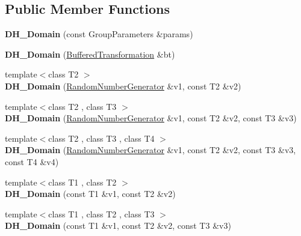 \subsection*{Public Member Functions}
\begin{DoxyCompactItemize}
\item 
\hypertarget{class_d_h___domain_a4bf1d2c72fc8aa1622604f30b9326781}{
{\bfseries DH\_\-Domain} (const GroupParameters \&params)}
\label{class_d_h___domain_a4bf1d2c72fc8aa1622604f30b9326781}

\item 
\hypertarget{class_d_h___domain_a22d4fd5eb712c853ebfdf976860e33c2}{
{\bfseries DH\_\-Domain} (\hyperlink{class_buffered_transformation}{BufferedTransformation} \&bt)}
\label{class_d_h___domain_a22d4fd5eb712c853ebfdf976860e33c2}

\item 
\hypertarget{class_d_h___domain_a0feb57c8aecf2942458d9d54c266047e}{
{\footnotesize template$<$class T2 $>$ }\\{\bfseries DH\_\-Domain} (\hyperlink{class_random_number_generator}{RandomNumberGenerator} \&v1, const T2 \&v2)}
\label{class_d_h___domain_a0feb57c8aecf2942458d9d54c266047e}

\item 
\hypertarget{class_d_h___domain_a0f6a43cbd906b4c2cb3a8d426b88148a}{
{\footnotesize template$<$class T2 , class T3 $>$ }\\{\bfseries DH\_\-Domain} (\hyperlink{class_random_number_generator}{RandomNumberGenerator} \&v1, const T2 \&v2, const T3 \&v3)}
\label{class_d_h___domain_a0f6a43cbd906b4c2cb3a8d426b88148a}

\item 
\hypertarget{class_d_h___domain_aa67c56ec1bbb356488d3b6e9d9f02e85}{
{\footnotesize template$<$class T2 , class T3 , class T4 $>$ }\\{\bfseries DH\_\-Domain} (\hyperlink{class_random_number_generator}{RandomNumberGenerator} \&v1, const T2 \&v2, const T3 \&v3, const T4 \&v4)}
\label{class_d_h___domain_aa67c56ec1bbb356488d3b6e9d9f02e85}

\item 
\hypertarget{class_d_h___domain_a636ba7b8547548621dc4f8c19a7216cb}{
{\footnotesize template$<$class T1 , class T2 $>$ }\\{\bfseries DH\_\-Domain} (const T1 \&v1, const T2 \&v2)}
\label{class_d_h___domain_a636ba7b8547548621dc4f8c19a7216cb}

\item 
\hypertarget{class_d_h___domain_a2442ccc8122411946adacd41f12fe838}{
{\footnotesize template$<$class T1 , class T2 , class T3 $>$ }\\{\bfseries DH\_\-Domain} (const T1 \&v1, const T2 \&v2, const T3 \&v3)}
\label{class_d_h___domain_a2442ccc8122411946adacd41f12fe838}


\end{DoxyCompactItemize}
